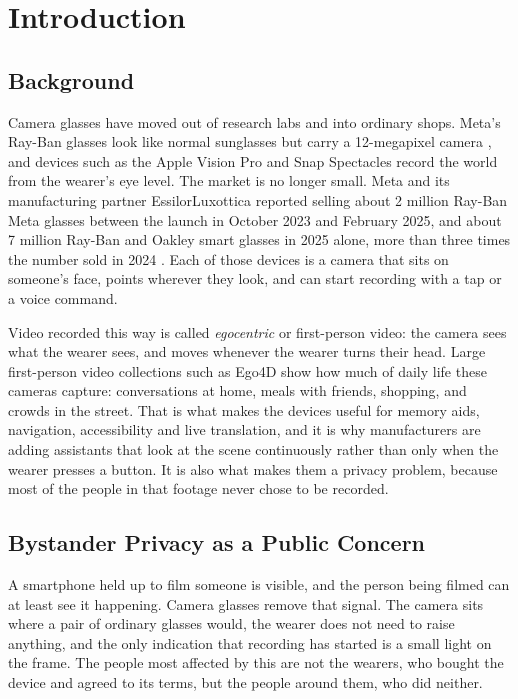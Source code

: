 \section{Introduction}
\label{sec:intro}

\subsection{Background}

Camera glasses have moved out of research labs and into ordinary shops. Meta's Ray-Ban
glasses look like normal sunglasses but carry a 12-megapixel camera
\cite{gsmarena_display}, and devices such as the Apple Vision Pro and Snap Spectacles
record the world from the wearer's eye level. The market is no longer small. Meta and its
manufacturing partner EssilorLuxottica reported selling about 2 million Ray-Ban Meta
glasses between the launch in October 2023 and February 2025, and about 7 million Ray-Ban
and Oakley smart glasses in 2025 alone, more than three times the number sold in 2024
\cite{uploadvr2026sales}. Each of those devices is a camera that sits on someone's face,
points wherever they look, and can start recording with a tap or a voice command.

Video recorded this way is called \emph{egocentric} or first-person video: the camera
sees what the wearer sees, and moves whenever the wearer turns their head. Large
first-person video collections such as Ego4D \cite{grauman2022ego4d} show how much of
daily life these cameras capture: conversations at home, meals with friends, shopping,
and crowds in the street. That is what makes the devices useful for memory aids,
navigation, accessibility and live translation, and it is why manufacturers are adding
assistants that look at the scene continuously rather than only when the wearer presses a
button. It is also what makes them a privacy problem, because most of the people in that
footage never chose to be recorded.

\subsection{Bystander Privacy as a Public Concern}
\label{sec:concern}

A smartphone held up to film someone is visible, and the person being filmed can at
least see it happening. Camera glasses remove that signal. The camera sits where a pair of
ordinary glasses would, the wearer does not need to raise anything, and the only
indication that recording has started is a small light on the frame. The people most
affected by this are not the wearers, who bought the device and agreed to its terms, but
the people around them, who did neither.

